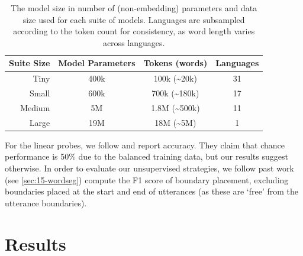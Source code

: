 \setlength{\tabcolsep}{2pt}
\begin{table}[t]
    \centering
    \small
    \begin{tabular}{rccc}
    \toprule
        Suite Size & Model Parameters & Tokens (words) & Languages \\
       \midrule
       Tiny & 400k & 100k (\textasciitilde20k) & 31 \\
       Small & 600k & 700k (\textasciitilde180k) & 17 \\
       Medium & 5M & 1.8M (\textasciitilde500k) & 11 \\
       Large & 19M & 18M (\textasciitilde5M) & 1 \\
       \bottomrule
    \end{tabular}
    \caption{The model size in number of (non-embedding) parameters and data size used for each suite of models. Languages are subsampled according to the token count for consistency, as word length varies across languages.}
    \label{tab:15-suites}
\end{table}

For the linear probes, we follow \citet{hahn-baroni-2019-tabula} and report accuracy. They claim that chance performance is 50\% due to the balanced training data, but our results suggest otherwise. In order to evaluate our unsupervised strategies, we follow past work (see \cref{sec:15-wordseg}) compute the F1 score of boundary placement, excluding boundaries placed at the start and end of utterances (as these are `free' from the utterance boundaries).

\section{Results}



